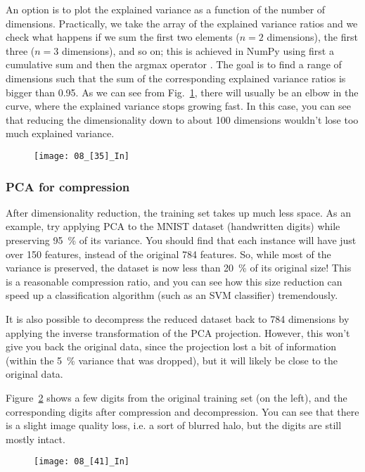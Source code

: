An option is to plot the explained variance as a function of the number of dimensions. Practically, we take the array of the explained variance ratios and we check what happens if we sum the first two elements ($n=2$ dimensions), the first three ($n=3$ dimensions), and so on; this is achieved in NumPy using first a cumulative sum  and then the argmax operator . The goal is to find a range of dimensions such that the sum of the corresponding explained variance ratios is bigger than 0.95. As we can see from Fig.~\ref{08_[35]_In}, there will usually be an elbow in the curve, where the explained variance stops growing fast. In this case, you can see that reducing the dimensionality down to about 100 dimensions wouldn't lose too much explained variance.
\begin{figure}[h!t]
\centering
\texttt{[image: 08\_[35]\_In]}
\caption{}\label{08_[35]_In}
\end{figure}
\subsubsection{PCA for compression}
After dimensionality reduction, the training set takes up much less space. As an example, try applying PCA to the MNIST dataset (handwritten digits) while preserving \SI{95}{\percent} of its variance. You should find that each instance will have just over 150 features, instead of the original 784 features. So, while most of the variance is preserved, the dataset is now less than \SI{20}{\percent} of its original size! This is a reasonable compression ratio, and you can see how this size reduction can speed up a classification algorithm (such as an SVM classifier) tremendously.

It is also possible to decompress the reduced dataset back to 784 dimensions by applying the inverse transformation of the PCA projection. However, this won't give you back the original data, since the projection lost a bit of information (within the \SI{5}{\percent} variance that was dropped), but it will likely be close to the original data.

Figure~\ref{08_[41]_In} shows a few digits from the original training set (on the left), and the corresponding digits after compression and decompression. You can see that there is a slight image quality loss, i.e. a sort of blurred halo, but the digits are still mostly intact.
\begin{figure}[h!t]
\centering
\texttt{[image: 08\_[41]\_In]}
\caption{}\label{08_[41]_In}
\end{figure}
